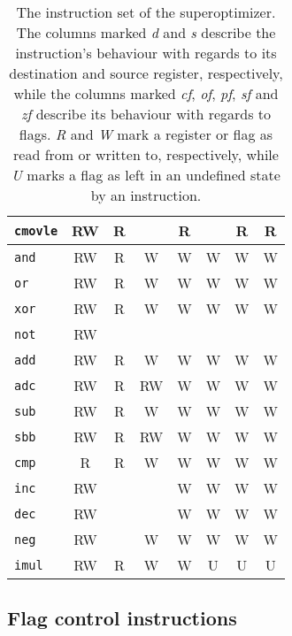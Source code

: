 \documentclass[a4paper,11pt]{kth-mag}
\begin{document}
\begin{table}
\begin{tabular}{l|cc|ccccc}
\verb|cmovle| & RW & R  &           & R         &           & R         & R         \\
\hline
\verb|and|    & RW & R  & W         & W         & W         & W         & W         \\
\verb|or|     & RW & R  & W         & W         & W         & W         & W         \\
\verb|xor|    & RW & R  & W         & W         & W         & W         & W         \\
\verb|not|    & RW &    &           &           &           &           &           \\
\hline
\verb|add|    & RW & R  & W         & W         & W         & W         & W         \\
\verb|adc|    & RW & R  & RW        & W         & W         & W         & W         \\
\verb|sub|    & RW & R  & W         & W         & W         & W         & W         \\
\verb|sbb|    & RW & R  & RW        & W         & W         & W         & W         \\
\verb|cmp|    & R  & R  & W         & W         & W         & W         & W         \\
\verb|inc|    & RW &    &           & W         & W         & W         & W         \\
\verb|dec|    & RW &    &           & W         & W         & W         & W         \\
\verb|neg|    & RW &    & W         & W         & W         & W         & W         \\
\hline
\verb|imul|   & RW & R  & W         & W         & U         & U         & U         \\
\end{tabular}
\caption{The instruction set of the superoptimizer.
The columns marked \emph{d} and \emph{s} describe the instruction's behaviour with regards to its destination and source register, respectively,
while the columns marked \emph{cf}, \emph{of}, \emph{pf}, \emph{sf} and \emph{zf} describe its behaviour with regards to flags.
\emph{R} and \emph{W} mark a register or flag as read from or written to, respectively, while \emph{U} marks a flag as left in an undefined state by an instruction.} %
\label{tab:insns}
\end{table}

\subsection{Flag control instructions}
\end{document}
